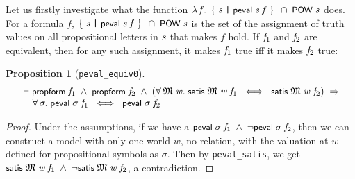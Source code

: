 \documentclass[letterpaper]{article}
\newtheorem{prop}{Proposition}
\renewcommand{\HOLConst}[1]{{\textsf{\upshape\small #1}}}
\renewcommand{\HOLinline}[1]{\ensuremath{#1}}
\newenvironment{holmath}{\begin{displaymath}\begin{array}{l}}{\end{array}\end{displaymath}\ignorespacesafterend}
\begin{document}
Let us firstly investigate what the function \HOLinline{\HOLTokenLambda{}\HOLBoundVar{f}.\;\HOLTokenLeftbrace{}\HOLBoundVar{s}\;\HOLTokenBar{}\;\HOLConst{peval}\;\HOLBoundVar{s}\;\HOLBoundVar{f}\HOLTokenRightbrace{}\;\HOLSymConst{\HOLTokenInter{}}\;\HOLConst{POW}\;\HOLFreeVar{s}} does. For a formula $f$, \HOLinline{\HOLTokenLeftbrace{}\HOLBoundVar{s}\;\HOLTokenBar{}\;\HOLConst{peval}\;\HOLBoundVar{s}\;\HOLFreeVar{f}\HOLTokenRightbrace{}\;\HOLSymConst{\HOLTokenInter{}}\;\HOLConst{POW}\;\HOLFreeVar{s}} is the set of the assignment of truth values on all propositional letters in \HOLinline{\HOLFreeVar{s}} that makes $f$ hold. If \HOLinline{\HOLFreeVar{f\sb{\mathrm{1}}}} and \HOLinline{\HOLFreeVar{f\sb{\mathrm{2}}}} are equivalent, then for any such assignment, it makes \HOLinline{\HOLFreeVar{f\sb{\mathrm{1}}}} true iff it makes \HOLinline{\HOLFreeVar{f\sb{\mathrm{2}}}} true:
\begin{prop}[\texttt{peval_equiv0}]
\begin{holmath}
  \ensuremath{\HOLTokenTurnstile}\HOLConst{propform}\;\HOLFreeVar{f\sb{\mathrm{1}}}\;\HOLSymConst{\HOLTokenConj{}}\;\HOLConst{propform}\;\HOLFreeVar{f\sb{\mathrm{2}}}\;\HOLSymConst{\HOLTokenConj{}}\;(\HOLSymConst{\HOLTokenForall{}}\HOLBoundVar{\ensuremath{\mathfrak{M}}}\;\HOLBoundVar{w}.\;\HOLConst{satis}\;\HOLBoundVar{\ensuremath{\mathfrak{M}}}\;\HOLBoundVar{w}\;\HOLFreeVar{f\sb{\mathrm{1}}}\;\HOLSymConst{\HOLTokenEquiv{}}\;\HOLConst{satis}\;\HOLBoundVar{\ensuremath{\mathfrak{M}}}\;\HOLBoundVar{w}\;\HOLFreeVar{f\sb{\mathrm{2}}})\;\HOLSymConst{\HOLTokenImp{}}\\
\;\;\;\;\;\HOLSymConst{\HOLTokenForall{}}\HOLBoundVar{\ensuremath{\sigma}}.\;\HOLConst{peval}\;\HOLBoundVar{\ensuremath{\sigma}}\;\HOLFreeVar{f\sb{\mathrm{1}}}\;\HOLSymConst{\HOLTokenEquiv{}}\;\HOLConst{peval}\;\HOLBoundVar{\ensuremath{\sigma}}\;\HOLFreeVar{f\sb{\mathrm{2}}}
\end{holmath}
\end{prop}
\begin{proof}
Under the assumptions, if we have a \HOLinline{\HOLConst{peval}\;\HOLFreeVar{\ensuremath{\sigma}}\;\HOLFreeVar{f\sb{\mathrm{1}}}\;\HOLSymConst{\HOLTokenConj{}}\;\HOLSymConst{\HOLTokenNeg{}}\HOLConst{peval}\;\HOLFreeVar{\ensuremath{\sigma}}\;\HOLFreeVar{f\sb{\mathrm{2}}}}, then we can construct a model with only one world $w$, no relation, with the valuation at $w$ defined for propositional symbols as $\sigma$. Then by \texttt{peval_satis}, we get \HOLinline{\HOLConst{satis}\;\HOLFreeVar{\ensuremath{\mathfrak{M}}}\;\HOLFreeVar{w}\;\HOLFreeVar{f\sb{\mathrm{1}}}\;\HOLSymConst{\HOLTokenConj{}}\;\HOLSymConst{\HOLTokenNeg{}}\HOLConst{satis}\;\HOLFreeVar{\ensuremath{\mathfrak{M}}}\;\HOLFreeVar{w}\;\HOLFreeVar{f\sb{\mathrm{2}}}}, a contradiction.
\end{proof}
\end{document}
